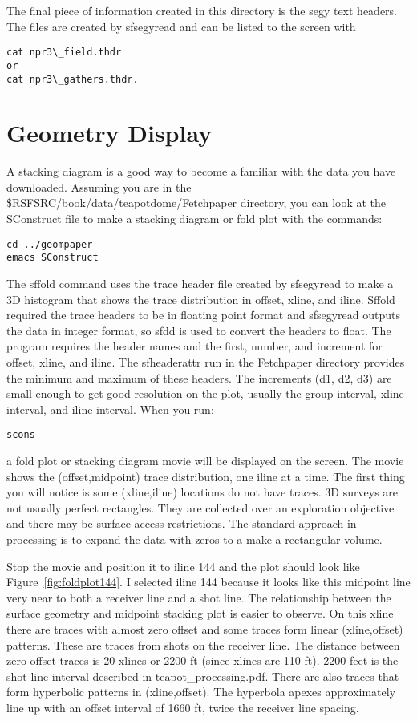 The final piece of information created in this directory is the segy text headers.   The files are created by sfsegyread and can be listed to the screen with 
\begin{verbatim}
cat npr3\_field.thdr 
or 
cat npr3\_gathers.thdr.  
\end{verbatim}

\section{Geometry Display}
A stacking diagram is a good way to become a familiar with the data you have downloaded.  Assuming you are in the \$RSFSRC/book/data/teapotdome/Fetchpaper directory, you can look at the SConstruct file to make a stacking diagram or fold plot with the commands:
\begin{verbatim}  
cd ../geompaper
emacs SConstruct
\end{verbatim}  
 
The sffold command uses the trace header file created by sfsegyread to make a 3D histogram that shows the trace distribution in offset, xline, and iline.  Sffold required the trace headers to be in floating point format and sfsegyread outputs the data in integer format, so sfdd is used to convert the headers to float.  The program requires the header names and the first, number, and increment for offset, xline, and iline.  The sfheaderattr run in the Fetchpaper directory provides the minimum and maximum of these headers.  The increments (d1, d2, d3) are small enough to get good resolution on the plot, usually the group interval, xline interval, and iline interval.  When you run:
\begin{verbatim}  
scons
\end{verbatim}  

a fold plot or stacking diagram movie will be displayed on the screen.  The movie shows the (offset,midpoint) trace distribution, one iline at a time. The first thing you will notice is some (xline,iline) locations do not have traces.  3D surveys are not usually perfect rectangles.  They are collected over an exploration objective and there may be surface access restrictions.  The standard approach in processing is to expand the data with zeros to a make a rectangular volume.

Stop the movie and position it to iline 144 and the plot should look like Figure~\ref{fig:foldplot144}.  I selected iline 144 because it looks like this midpoint line very near to both a receiver line and a shot line.   The relationship between the surface geometry and midpoint stacking plot is easier to observe.  On this xline there are traces with almost zero offset and some traces form linear (xline,offset) patterns.  These are traces from shots on the receiver line.  The distance between zero offset traces is 20 xlines or 2200 ft (since xlines are 110 ft).  2200 feet is the shot line interval described in teapot\_processing.pdf.  There are also traces that form hyperbolic patterns in (xline,offset).  The hyperbola apexes approximately line up with an offset interval of 1660 ft, twice the receiver line spacing.

